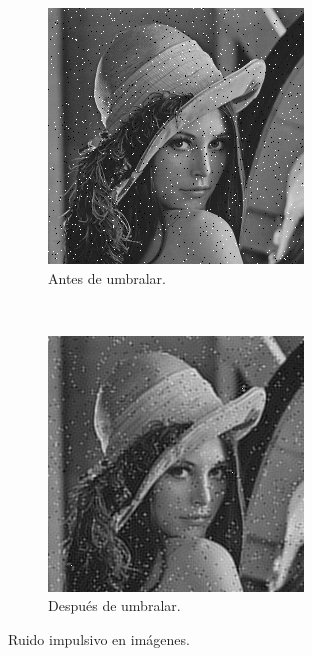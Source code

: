 \documentclass[a4paper,10pt,twoside]{article}
\begin{document}
\begin{figure}[H]
  \centering
  \begin{subfigure}[b]{0.45\textwidth}
    \centering
    \includegraphics[width=\textwidth]{graficos/lena_impulsivo_muestra.png}    
    \caption{Antes de umbralar.}
  \end{subfigure}
  ~ 
  \begin{subfigure}[b]{0.45\textwidth}
    \centering
    \includegraphics[width=\textwidth]{graficos/lena_impulsivo_umbralizar_muestra.png}
    \caption{Después de umbralar.}
  \end{subfigure}
  \caption{Ruido impulsivo en imágenes.}
\end{figure}
\end{document}
